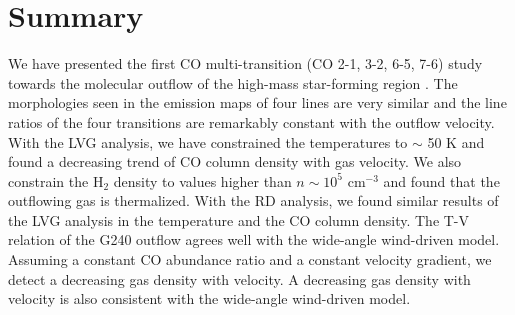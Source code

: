 \section{Summary}\label{summary}

We have presented the first CO multi-transition (CO 2-1, 3-2, 6-5, 7-6) study towards the molecular outflow of the high-mass star-forming region . The morphologies seen in the emission maps of four lines are very similar and the line ratios of the four transitions are remarkably constant with the outflow velocity.  With the LVG analysis, we have constrained the temperatures to $\sim$ 50 K and found a decreasing trend of CO column density with gas velocity. We also constrain the H$_2$ density to values higher than $n \sim 10^5$ cm$^{-3}$ and found that the outflowing gas is thermalized. With the RD analysis, we found similar results of the LVG analysis in the temperature and the CO column density. The T-V relation of the G240 outflow agrees well with the wide-angle wind-driven model. Assuming a constant CO abundance ratio and a constant velocity gradient, we detect a decreasing gas density with velocity. A decreasing gas density with velocity is also consistent with the wide-angle wind-driven model. 

